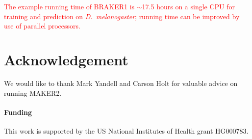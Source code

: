\documentclass{bioinfo}
\begin{document}
\textcolor{red}{The example running time of BRAKER1 is $\sim$17.5 hours on a single CPU for training and prediction on \textit{D.~melanogaster}; running time can be improved by use of parallel processors.}


\section*{Acknowledgement}

We would like to thank Mark Yandell and Carson Holt for valuable advice on running MAKER2.

\paragraph{Funding\textcolon} This work is supported by the US National Institutes of Health grant HG000783.

%
%
%
%
%
%
%
%
%
\end{document}
